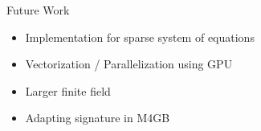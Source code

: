 \documentclass{beamer}
\begin{document}
\begin{frame}{Future Work}
  \begin{itemize}
  \item Implementation for sparse system of equations
  \item Vectorization / Parallelization using GPU
  \item Larger finite field
  \item Adapting signature in M4GB
  \end{itemize}
\end{frame}

\begin{frame}
\end{frame}

\begin{frame}
\end{frame}
\end{document}
